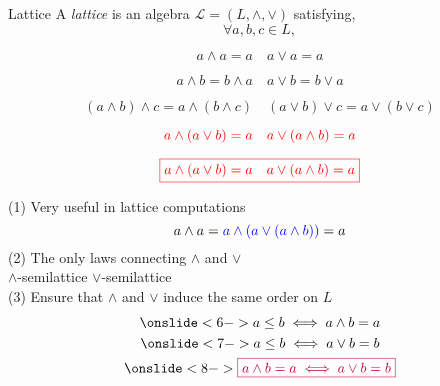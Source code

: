 
\begin{frame}{}
  \begin{definition}{Lattice}
    A {\it lattice} is an algebra $\mathcal{L} = (L, \land, \lor)$ satisfying, 
    \[
      \forall a, b, c \in L,
    \]
    \vspace{-0.50cm}
    \begin{description}[Commutativity:]
      \item[\teal{Idempotency:}]
	\[
	  a \land a = a \quad a \lor a = a
	\]
      \item[Commutativity:]
	\[
	  a \land b = b \land a \quad a \lor b = b \lor a
	\]
      \item[Associativity:]
	\[
	  (a \land b) \land c = a \land (b \land c) \quad (a \lor b) \lor c = a \lor (b \lor c)
	\]
      \item[Absorption:]
	\[
	  \textcolor{red}{a \land (a \lor b) = a} \quad \textcolor{red}{a \lor (a \land b) = a}
	\]
    \end{description}
  \end{definition}
\end{frame}

\begin{frame}{}
  \[
    \textcolor{red}{\boxed{a \land (a \lor b) = a \quad a \lor (a \land b) = a}}
  \]

  \pause
  \vspace{0.30cm}
  \begin{center}
    (1) Very useful in lattice computations \\[-0.60cm] \pause
    \[
      a \land a = \textcolor{blue}{a \land (a \lor (a \land b))} = a
    \]
    \pause
    (2) The only laws connecting $\land$ and $\lor$ \\[10pt] \pause
    $\land$-semilattice \qquad $\lor$-semilattice \\[15pt] \pause
    (3) Ensure that $\land$ and $\lor$ induce the same order on $L$  \pause
    \begin{gather*}
      \onslide<6->{a \le b \iff a \land b = a} \\
      \onslide<7->{a \le b \iff a \lor b = b} \\
      \onslide<8->{\purple{\boxed{a \land b = a \iff a \lor b = b}}} 
    \end{gather*}
  \end{center}
\end{frame}

